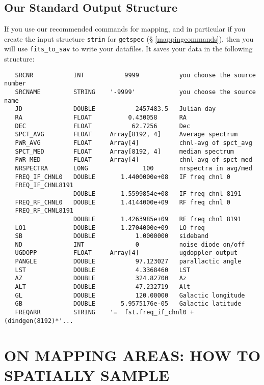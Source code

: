 \documentclass[psfig,preprint]{aastex}
\begin{document}
\subsection{Our Standard Output Structure}
If you use our recommended commands for mapping, and in particular if
you create the input structure {\tt strin} for {\tt getspec} (\S
\ref{mappingcommands}), then you will use {\tt fits\_to\_sav} to write
your datafiles. It saves your data in the following structure:
\begin{verbatim}
   SRCNR           INT           9999           you choose the source number
   SRCNAME         STRING    '-9999'            you choose the source name
   JD              DOUBLE           2457483.5   Julian day
   RA              FLOAT          0.430058      RA
   DEC             FLOAT           62.7256      Dec
   SPCT_AVG        FLOAT     Array[8192, 4]     Average spectrum
   PWR_AVG         FLOAT     Array[4]           chnl-avg of spct_avg
   SPCT_MED        FLOAT     Array[8192, 4]     median spectrum
   PWR_MED         FLOAT     Array[4]           chnl-avg of spct_med
   NRSPECTRA       LONG               100       nrspectra in avg/med
   FREQ_IF_CHNL0   DOUBLE       1.4400000e+08   IF freq chnl 0
   FREQ_IF_CHNL8191
                   DOUBLE       1.5599854e+08   IF freq chnl 8191
   FREQ_RF_CHNL0   DOUBLE       1.4144000e+09   RF freq chnl 0
   FREQ_RF_CHNL8191
                   DOUBLE       1.4263985e+09   RF freq chnl 8191
   LO1             DOUBLE       1.2704000e+09   LO freq
   SB              DOUBLE           1.0000000   sideband
   ND              INT              0           noise diode on/off
   UGDOPP          FLOAT     Array[4]           ugdoppler output
   PANGLE          DOUBLE           97.123027   parallactic angle
   LST             DOUBLE           4.3368460   LST
   AZ              DOUBLE           324.82700   Az
   ALT             DOUBLE           47.232719   Alt
   GL              DOUBLE           120.00000   Galactic longitude
   GB              DOUBLE       5.9575176e-05   Galactic latitude
   FREQARR         STRING    '=  fst.freq_if_chnl0 + (dindgen(8192)*'...
\end{verbatim}
 
\section{ON MAPPING AREAS: HOW TO SPATIALLY SAMPLE} \label{sampling} 
\end{document}
